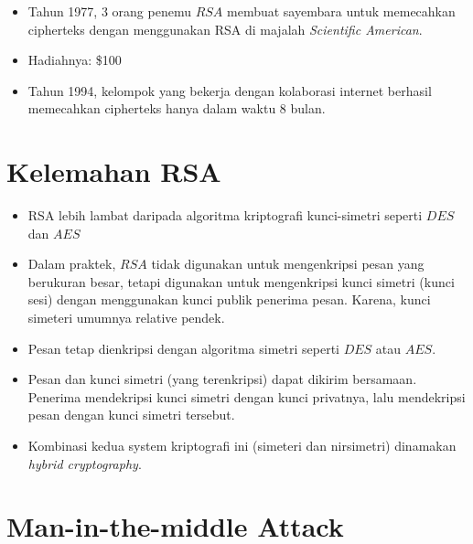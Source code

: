 \documentclass{article}
\begin{document}
\newpage


\begin{itemize}
    \item Tahun 1977, 3 orang penemu $RSA$ membuat sayembara untuk memecahkan cipherteks dengan menggunakan RSA di majalah \textit{Scientific American}.
    \item Hadiahnya: \$100
    \item Tahun 1994, kelompok yang bekerja dengan kolaborasi internet berhasil memecahkan cipherteks hanya dalam waktu 8 bulan.
\end{itemize}

\newpage


\section*{Kelemahan RSA}

\begin{itemize}
    \item RSA lebih lambat daripada algoritma kriptografi kunci-simetri seperti $DES$ dan $AES$
    \item Dalam praktek, $RSA$ tidak digunakan untuk mengenkripsi pesan yang berukuran besar, tetapi digunakan untuk mengenkripsi kunci simetri (kunci sesi) dengan menggunakan kunci publik penerima pesan. Karena, kunci simeteri umumnya relative pendek.
    \item Pesan tetap dienkripsi dengan algoritma simetri seperti $DES$ atau $AES$.
    \item Pesan dan kunci simetri (yang terenkripsi) dapat dikirim bersamaan. Penerima mendekripsi kunci simetri dengan kunci privatnya, lalu mendekripsi pesan dengan kunci simetri tersebut.
    \item Kombinasi kedua system kriptografi ini (simeteri dan nirsimetri) dinamakan \textit{hybrid cryptography}.
\end{itemize}

\newpage


\section*{Man-in-the-middle Attack}
\end{document}

